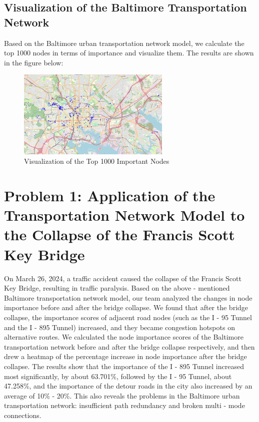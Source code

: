 \documentclass{mcmthesis}
\begin{document}
\subsection{Visualization of the Baltimore Transportation Network}

Based on the Baltimore urban transportation network model, we calculate the top 1000 nodes in terms of importance and visualize them. The results are shown in the figure below:

\begin{figure}[H]
  \centering
  \includegraphics[width=0.65\textwidth]{figures/vis.png}
  \caption{Visualization of the Top 1000 Important Nodes}
  \label{fig:vis}
\end{figure}

\section{Problem 1: Application of the Transportation Network Model to the Collapse of the Francis Scott Key Bridge}

On March 26, 2024, a traffic accident caused the collapse of the Francis Scott Key Bridge, resulting in traffic paralysis. Based on the above - mentioned Baltimore transportation network model, our team analyzed the changes in node importance before and after the bridge collapse. We found that after the bridge collapse, the importance scores of adjacent road nodes (such as the I - 95 Tunnel and the I - 895 Tunnel) increased, and they became congestion hotspots on alternative routes. We calculated the node importance scores of the Baltimore transportation network before and after the bridge collapse respectively, and then drew a heatmap of the percentage increase in node importance after the bridge collapse. The results show that the importance of the I - 895 Tunnel increased most significantly, by about 63.701\%, followed by the I - 95 Tunnel, about 47.258\%, and the importance of the detour roads in the city also increased by an average of 10\% - 20\%. This also reveals the problems in the Baltimore urban transportation network: insufficient path redundancy and broken multi - mode connections.
\end{document}
